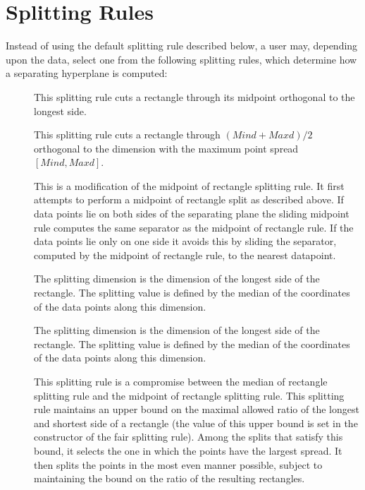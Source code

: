\section{Splitting Rules}
\label{Spatial_Searching:Splitting_rule_section}

Instead of using the default splitting rule  described below,
a user may, depending upon the data, select 
one from the following splitting rules,
which determine how a separating hyperplane is computed:

\begin{description}

\item[ ]

This splitting rule cuts a rectangle through its midpoint orthogonal
to the longest side.

\item[ ]

This splitting rule cuts a rectangle through $(Mind+Maxd)/2$ orthogonal
to the dimension with the maximum point spread $[Mind,Maxd]$.

\item[ ]

This is a modification of the midpoint of rectangle splitting rule.
It first attempts to perform a midpoint of rectangle split as
described above. If data points lie on both sides of the separating
plane the sliding midpoint rule computes the same separator as
the midpoint of rectangle rule. If the data points lie only on one
side it avoids this by sliding the separator, computed by
the midpoint of rectangle rule, to the nearest datapoint.

\item[ ]

The splitting dimension is the dimension of the longest side of the rectangle.
The splitting value is defined by the median of the coordinates of the data points
along this dimension.

\item[ ]

The splitting dimension is the dimension of the longest side of the rectangle.
The splitting value is defined by the median of the coordinates of the data points
along this dimension.

\item[ ]

This splitting rule is a compromise between the median of rectangle
splitting rule and the midpoint of rectangle splitting rule. This
splitting rule maintains an upper bound on the maximal allowed ratio
of the longest and shortest side of a rectangle (the value of this
upper bound is set in the constructor of the fair splitting
rule). Among the splits that satisfy this bound, it selects the one in
which the points have the largest spread.  It then splits the points
in the most even manner possible, subject to maintaining the bound on
the ratio of the resulting rectangles.


\end{description}
